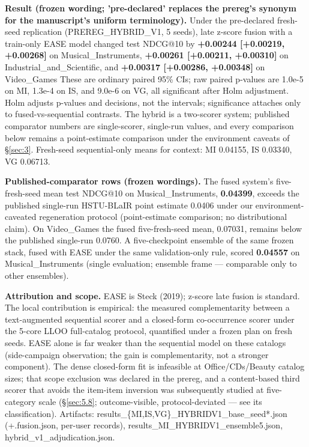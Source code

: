 \textbf{Result (frozen wording; 'pre-declared' replaces the prereg's synonym for the manuscript's uniform terminology).} Under the pre-declared fresh-seed replication (PREREG\_HYBRID\_V1, 5 seeds), late z-score fusion with a train-only EASE model changed test NDCG@10 by \textbf{+0.00244 {[}+0.00219, +0.00268{]}} on Musical\_Instruments, \textbf{+0.00261 {[}+0.00211, +0.00310{]}} on Industrial\_and\_Scientific, and \textbf{+0.00317 {[}+0.00286, +0.00348{]}} on Video\_Games These are ordinary paired 95\% CIs; raw paired p-values are 1.0e-5 on MI, 1.3e-4 on IS, and 9.0e-6 on VG, all significant after Holm adjustment. Holm adjusts p-values and decisions, not the intervals; significance attaches only to fused-vs-sequential contrasts. The hybrid is a two-scorer system; published comparator numbers are single-scorer, single-run values, and every comparison below remains a point-estimate comparison under the environment caveats of \S\ref{sec:3}. Fresh-seed sequential-only means for context: MI 0.04155, IS 0.03340, VG 0.06713.

\textbf{Published-comparator rows (frozen wordings).} The fused system's five-fresh-seed mean test NDCG@10 on Musical\_Instruments, \textbf{0.04399}, exceeds the published single-run HSTU-BLaIR point estimate 0.0406 under our environment-caveated regeneration protocol (point-estimate comparison; no distributional claim). On Video\_Games the fused five-fresh-seed mean, 0.07031, remains below the published single-run 0.0760. A five-checkpoint ensemble of the same frozen stack, fused with EASE under the same validation-only rule, scored \textbf{0.04557} on Musical\_Instruments (single evaluation; ensemble frame --- comparable only to other ensembles).

\textbf{Attribution and scope.} EASE is Steck (2019); z-score late fusion is standard. The local contribution is empirical: the measured complementarity between a text-augmented sequential scorer and a closed-form co-occurrence scorer under the 5-core LLOO full-catalog protocol, quantified under a frozen plan on fresh seeds. EASE alone is far weaker than the sequential model on these catalogs (side-campaign observation; the gain is complementarity, not a stronger component). The dense closed-form fit is infeasible at Office/CDs/Beauty catalog sizes; that scope exclusion was declared in the prereg, and a content-based third scorer that avoids the item-item inversion was subsequently studied at five-category scale (\S\ref{sec:5.8}; outcome-visible, protocol-deviated --- see its classification). Artifacts: results\_\{MI,IS,VG\}\_HYBRIDV1\_base\_seed*.json (+.fusion.json, per-user records), results\_MI\_HYBRIDV1\_ensemble5.json, hybrid\_v1\_adjudication.json.

